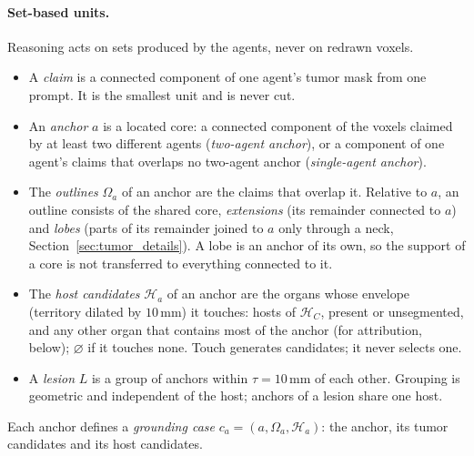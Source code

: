 \documentclass[fleqn,10pt]{olplainarticle}
\begin{document}
\paragraph{Set-based units.}
Reasoning acts on sets produced by the agents, never on redrawn voxels.
\begin{itemize}
\item A \emph{claim} is a connected component of one agent's tumor mask from one prompt. It is the smallest unit and is
never cut.
\item An \emph{anchor} $a$ is a located core: a connected component of the voxels claimed by at least two different
agents (\emph{two-agent anchor}), or a component of one agent's claims that overlaps no two-agent anchor
(\emph{single-agent anchor}).
\item The \emph{outlines} $\Omega_a$ of an anchor are the claims that overlap it. Relative to $a$, an outline consists of
the shared core, \emph{extensions} (its remainder connected to $a$) and \emph{lobes} (parts of its remainder joined to
$a$ only through a neck, Section~\ref{sec:tumor_details}). A lobe is an anchor of its own, so the support of a core is not
transferred to everything connected to it.
\item The \emph{host candidates} $\mathcal{H}_a$ of an anchor are the organs whose envelope (territory dilated by
$10$\,mm) it touches: hosts of $\mathcal{H}_C$, present or unsegmented, and any other organ that contains most of the
anchor (for attribution, below); $\varnothing$ if it touches none. Touch generates candidates; it never selects one.
\item A \emph{lesion} $L$ is a group of anchors within $\tau=10$\,mm of each other. Grouping is geometric and independent
of the host; anchors of a lesion share one host.
\end{itemize}
Each anchor defines a \emph{grounding case} $c_a=(a,\Omega_a,\mathcal{H}_a)$: the anchor, its tumor candidates and its
host candidates.
\end{document}
